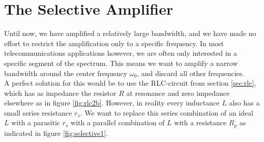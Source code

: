 \section{The Selective Amplifier}
\label{sec:selective_amp}
Until now, we have amplified a relatively large bandwidth, and we have made no effort to restrict the amplification only to a specific frequency. In most telecommunications applications however, we are often only interested in a specific segment of the spectrum. This means we want to amplify a narrow bandwidth around the center frequency $\omega_0$, and discard all other frequencies.\\
A perfect solution for this would be to use the RLC-circuit from section \ref{sec:rlc}, which has as impedance the resistor $R$ at resonance and zero impedance elsewhere as in figure \ref{fig:rlc2b}. However, in reality every inductance $L$ also has a small series resistance $r_s$. We want to replace this series combination of an ideal $L$ with a parasitic $r_s$ with a parallel combination of $L$ with a resistance $R_p$ as indicated in figure \ref{fig:selective1}.\\

